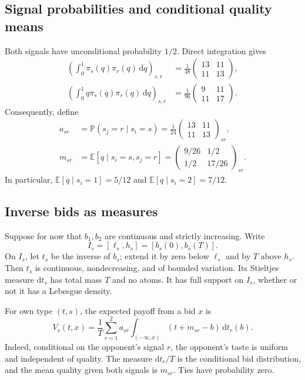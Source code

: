\documentclass[11pt,a4paper]{article}
\numberwithin{equation}{section}
\theoremstyle{definition}
\theoremstyle{remark}
\newcommand{\E}{\mathbb E}
\newcommand{\Prob}{\mathbb P}
\newcommand{\dd}{\,\mathrm d}
\begin{document}
\subsection{Signal probabilities and conditional quality means}
Both signals have unconditional probability $1/2$. Direct integration gives
\begin{align}
\left(\int_0^1\pi_s(q)\pi_r(q)\dd q\right)_{s,r}
 &=\frac1{48}\begin{pmatrix}13&11\\11&13\end{pmatrix},
 \label{eq:jointsignals}\\
\left(\int_0^1 q\pi_s(q)\pi_r(q)\dd q\right)_{s,r}
 &=\frac1{96}\begin{pmatrix}9&11\\11&17\end{pmatrix}.
 \label{eq:jointquality}
\end{align}
Consequently, define
\begin{equation}
\label{eq:am}
\begin{aligned}
a_{sr}&=\Prob(s_j=r\mid s_i=s)
=\frac1{24}\begin{pmatrix}13&11\\11&13\end{pmatrix}_{sr},\\[4pt]
m_{sr}&=\E[q\mid s_i=s,s_j=r]
=\begin{pmatrix}9/26&1/2\\1/2&17/26\end{pmatrix}_{sr}.
\end{aligned}
\end{equation}
In particular, $\E[q\mid s_i=1]=5/12$ and $\E[q\mid s_i=2]=7/12$.

\subsection{Inverse bids as measures}
Suppose for now that $b_1,b_2$ are continuous and strictly increasing. Write
\[
 I_s=[\ell_s,h_s]=[b_s(0),b_s(T)].
\]
On $I_s$, let $t_s$ be the inverse of $b_s$; extend it by zero below $\ell_s$ and by $T$ above $h_s$. Then $t_s$ is continuous, nondecreasing, and of bounded variation. Its Stieltjes measure $\mathrm dt_s$ has total mass $T$ and no atoms. It has full support on $I_s$, whether or not it has a Lebesgue density.

For own type $(t,s)$, the expected payoff from a bid $x$ is
\begin{equation}
\label{eq:payoff}
 V_s(t,x)=\frac1T\sum_{r=1}^2 a_{sr}
 \int_{(-\infty,x)}(t+m_{sr}-b)\,\mathrm dt_r(b).
\end{equation}
Indeed, conditional on the opponent's signal $r$, the opponent's taste is uniform and independent of quality. The measure $\mathrm dt_r/T$ is the conditional bid distribution, and the mean quality given both signals is $m_{sr}$. Ties have probability zero.
\end{document}
